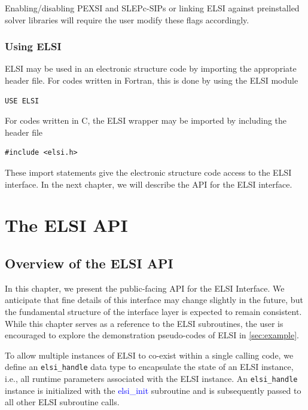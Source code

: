 \documentclass{report}
\begin{document}
Enabling/disabling PEXSI and SLEPc-SIPs or linking ELSI against preinstalled solver libraries will require the user modify these flags accordingly.

\subsection{Using ELSI}
\label{subsec:import_use}
ELSI may be used in an electronic structure code by importing the appropriate header file.  For codes written in Fortran, this is done by using the ELSI module
\begin{tcolorbox}
\begin{verbatim}
USE ELSI
\end{verbatim}
\end{tcolorbox}

For codes written in C, the ELSI wrapper may be imported by including the header file
\begin{tcolorbox}
\begin{verbatim}
#include <elsi.h>
\end{verbatim}
\end{tcolorbox}

These import statements give the electronic structure code access to the ELSI interface.  In the next chapter, we will describe the API for the ELSI interface.

\chapter{The ELSI API}
\section{Overview of the ELSI API}
\label{sec:api}
In this chapter, we present the public-facing API for the ELSI Interface.  We anticipate that fine details of this interface may change slightly in the future, but the fundamental structure of the interface layer is expected to remain consistent.  While this chapter serves as a reference to the ELSI subroutines, the user is encouraged to explore the demonstration pseudo-codes of ELSI in \ref{sec:example}.

To allow multiple instances of ELSI to co-exist within a single calling code, we define an \texttt{elsi\_handle} data type to encapsulate the state of an ELSI instance, i.e., all runtime parameters associated with the ELSI instance.  An \texttt{elsi\_handle} instance is initialized with the \textcolor{blue}{elsi\_init} subroutine and is subsequently passed to all other ELSI subroutine calls.
\end{document}
